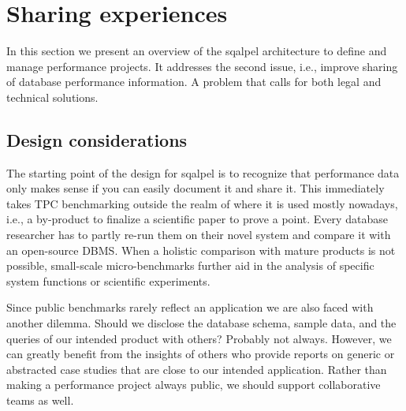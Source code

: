 \documentclass{cidr-2019}
\begin{document}


\section{Sharing experiences}\label{sharing}
In this section we present an overview of the {\sc sqalpel}
architecture to define and manage performance projects. It addresses
the second issue, i.e., improve sharing of database performance
information. A problem that calls for both legal and technical
solutions.

\subsection{Design considerations}
The starting point of the design for {\sc
sqalpel} is to recognize that performance data only makes sense if
you can easily document it and share it. 
This immediately takes TPC benchmarking outside the realm of where it is used mostly nowadays, i.e., a
  by-product to finalize a scientific paper to prove a point. Every
  database researcher has to partly re-run them on their novel system
  and compare it with an open-source DBMS.
When a holistic comparison with mature products is not possible, small-scale
micro-benchmarks further aid in the analysis of specific system
functions or scientific experiments.

Since public benchmarks rarely reflect an application we
are also faced with another dilemma. Should we disclose the database
schema, sample data, and the queries of our intended product with
others? Probably not always.
However, we can greatly benefit from the insights of others who provide reports on generic or
abstracted case studies that are close to our intended
application. 
Rather than making a performance project always public,  we should support 
collaborative teams as well.
\end{document}
